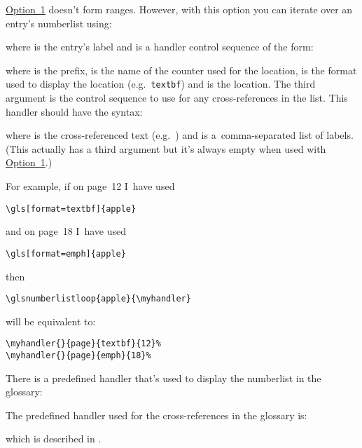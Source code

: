 \documentclass[report,inlinetitle]{nlctdoc}
\newcommand*{\opt}[1]{\hyperlink{option#1}{Option~#1}}
\begin{document}
\opt1 doesn't form ranges. However, with this option you
can iterate over an entry's \gls{numberlist} using:
\begin{definition}[\DescribeMacro\glsnumberlistloop]
\end{definition}
where  is the entry's label and  is a
handler control sequence of the form:
\begin{definition}
\end{definition}
where  is the  prefix,  is
the name of the counter used for the location,  is the
format used to display the location (e.g.\ \texttt{textbf})
and  is the location. The third argument is the
control sequence to use for any cross-references in the list. This
handler should have the syntax:
\begin{definition}
\end{definition}
where  is the cross-referenced text (e.g.\ ) and
 is a~comma-separated list of labels. (This actually
has a third argument but it's always empty when used with \opt1.)

For example, if on page~12
I~have used
\begin{verbatim}
\gls[format=textbf]{apple}
\end{verbatim}
and on page~18 I~have used
\begin{verbatim}
\gls[format=emph]{apple}
\end{verbatim}
then
\begin{verbatim}
\glsnumberlistloop{apple}{\myhandler}
\end{verbatim}
will be equivalent to:
\begin{verbatim}
\myhandler{}{page}{textbf}{12}%
\myhandler{}{page}{emph}{18}%
\end{verbatim}
There is a predefined handler that's used to display the
\gls{numberlist} in the glossary:
\begin{definition}[\DescribeMacro\glsnoidxdisplayloc]
\end{definition}
The predefined handler used for the cross-references in the glossary is:
\begin{definition}
\end{definition}
which is described in .
\end{document}
